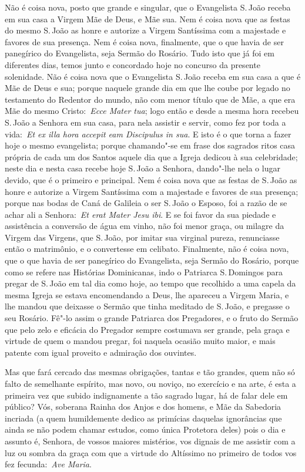 \noindent{}Não é coisa nova, posto que grande e singular, que o
Evangelista S.\,João receba em sua casa a Virgem Mãe de Deus, e Mãe sua.
Nem é coisa nova que as festas do mesmo S.\,João as honre e autorize a
Virgem Santíssima com a majestade e favores de sua presença. Nem é coisa
nova, finalmente, que o que havia de ser panegírico do Evangelista, seja
Sermão do Rosário. Tudo isto que já foi em diferentes dias, temos junto
e concordado hoje no concurso da presente solenidade. Não é coisa nova
que o Evangelista S.\,João receba em sua casa a que é Mãe de Deus e sua;
porque naquele grande dia em que lhe coube por legado no testamento do
Redentor do mundo, não com menor título que de Mãe, a que era Mãe do
mesmo Cristo:~\emph{Ecce Mater tua}; logo então e desde
a mesma hora recebeu S.\,João a Senhora em sua casa, para nela assistir e
servir, como fez por toda a vida:~\emph{Et ex illa hora accepit eam
Discipulus in sua}. E isto é o que torna a fazer hoje o
mesmo evangelista; porque chamando"-se em frase dos sagrados ritos casa
própria de cada um dos Santos aquele dia que a Igreja dedicou à sua
celebridade; neste dia e nesta casa recebe hoje S.\,João a Senhora,
dando"-lhe nela o lugar devido, que é o primeiro e principal. Nem é coisa
nova que as festas de S.\,João as honre e autorize a Virgem Santíssima
com a majestade e favores de sua presença; porque nas bodas de Caná de
Galileia o ser S.\,João o Esposo, foi a razão de se achar ali a
Senhora:~\emph{Et erat Mater Jesu ibi}. E se foi favor
da sua piedade e assistência a conversão de água em vinho, não foi menor
graça, ou milagre da Virgem das Virgens, que S.\,João, por imitar sua
virginal pureza, renunciasse então o matrimônio, e o convertesse em
celibato. Finalmente, não é coisa nova, que o que havia de ser
panegírico do Evangelista, seja Sermão do Rosário, porque como se refere
nas Histórias Dominicanas, indo o Patriarca S.\,Domingos para pregar de
S.\,João em tal dia como hoje, ao tempo que recolhido a uma capela da
mesma Igreja se estava encomendando a Deus, lhe apareceu a Virgem Maria,
e lhe mandou que deixasse o Sermão que tinha meditado de S.\,João, e
pregasse o seu Rosário. Fê"-lo assim o grande Patriarca dos Pregadores, e
o fruto do Sermão que pelo zelo e eficácia do Pregador sempre costumava
ser grande, pela graça e virtude de quem o mandou pregar, foi naquela
ocasião muito maior, e mais patente com igual proveito e admiração dos
ouvintes.


Mas que fará cercado das mesmas obrigações, tantas e tão
grandes, quem não só falto de semelhante espírito, mas novo, ou noviço,
no exercício e na arte, é esta a primeira vez que subido indignamente a
tão sagrado lugar, há de falar dele em público? Vós,
soberana Rainha dos Anjos e dos homens, e Mãe da Sabedoria incriada (a
quem humildemente dedico as primícias daquelas ignorâncias que ainda se
não podem chamar estudos, como única Protetora deles) pois o dia e
assunto é, Senhora, de vossos maiores mistérios, vos dignais de me
assistir com a luz ou sombra da graça com que a virtude do Altíssimo no
primeiro de todos vos fez fecunda:~\emph{Ave Maria}.


